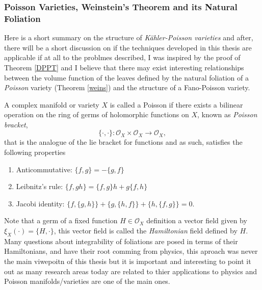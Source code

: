 \documentclass[12pt,twoside,a4paper]{report}
\newcommand{\osheaf}{\ensuremath{\mathcal O }}
\begin{document}
\subsubsection*{Poisson Varieties, Weinstein's Theorem and its Natural Foliation}
\noindent Here is a short summary on the structure of \emph{Kähler-Poisson varieties} and after, there will be a short discussion on if the techniques developed in this thesis are applicable if at all to the problmes described, I was inspired by the proof of Theorem \ref{DPPT} and I believe that there may exist interesting relationships between the volume function of the leaves defined by the natural foliation of a \emph{Poisson} variety (Theorem \ref{weins}) and the structure of a Fano-Poisson variety.

A complex manifold or variety $X$ is called a Poisson if there exists a bilinear operation on the ring of germs of holomorphic functions on $X$, known as \emph{Poisson bracket},
\begin{equation}
    \{\cdot,\cdot\}:\osheaf_{X}\times\osheaf_{X}\rightarrow\osheaf_{X},
\end{equation}
  that is the analogue of the lie bracket for functions and as such, satisfies the following properties
\begin{enumerate}
    \item Anticommutative: $\{f,g\} = -\{g,f\}$
    \item Leibnitz's rule: $\{f,gh\}=\{f,g\}h + g\{f,h\}$
    \item Jacobi identity: $\{f,\{g,h\}\}+\{g,\{h,f\}\} + \{h,\{ f,g\}\}=0$.
\end{enumerate}

Note that a germ of a fixed function $H\in\osheaf_{X}$ definition a vector field given by $\xi_{X}(\cdot)=\{H,\cdot\}$, this vector field is called the \emph{Hamiltonian} field defined by $H$. Many questions about integrability of foliations are posed in terms of their Hamiltonians, and have their root comming from physics, this aproach was never the main viwepoitn of this thesis but it is important and interesting to point it out as many research areas today are related to thier applications to physics and Poisson manifolds/varieties are one of the main ones.
\end{document}
